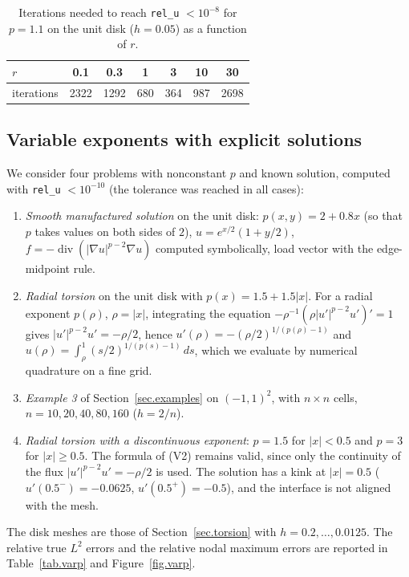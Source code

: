 \documentclass[11pt]{amsart}
\DeclareMathOperator{\dvg}{div}
\theoremstyle{definition}
\theoremstyle{remark}
\numberwithin{equation}{section}
\begin{document}
\begin{table}[ht]
\centering
\caption{Iterations needed to reach \texttt{rel\_u} $<10^{-8}$ for $p=1.1$ on the unit disk ($h=0.05$) as a function of $r$.}\label{tab.r}
\begin{tabular}{lcccccc}
\toprule
$r$ & 0.1 & 0.3 & 1 & 3 & 10 & 30\\
\midrule
iterations & 2322 & 1292 & 680 & 364 & 987 & 2698\\
\bottomrule
\end{tabular}
\end{table}

\subsection{Variable exponents with explicit solutions}\label{sec.varp}
We consider four problems with nonconstant $p$ and known solution, computed with \texttt{rel\_u} $<10^{-10}$ (the tolerance was reached in all cases):
\begin{enumerate}
\item[(V1)] \emph{Smooth manufactured solution} on the unit disk: $p(x,y)=2+0.8x$ (so that $p$ takes values on both sides of $2$), $u=e^{x/2}(1+y/2)$, $f=-\dvg(|\nabla u|^{p-2}\nabla u)$ computed symbolically, load vector with the edge-midpoint rule.
\item[(V2)] \emph{Radial torsion} on the unit disk with $p(x)=1.5+1.5|x|$. For a radial exponent $p(\rho)$, $\rho=|x|$, integrating the equation $-\rho^{-1}(\rho|u'|^{p-2}u')'=1$ gives $|u'|^{p-2}u'=-\rho/2$, hence $u'(\rho)=-(\rho/2)^{1/(p(\rho)-1)}$ and $u(\rho)=\int_\rho^1(s/2)^{1/(p(s)-1)}\,ds$, which we evaluate by numerical quadrature on a fine grid.
\item[(V3)] \emph{Example 3} of Section~\ref{sec.examples} on $(-1,1)^2$, with $n\times n$ cells, $n=10,20,40,80,160$ ($h=2/n$).
\item[(V4)] \emph{Radial torsion with a discontinuous exponent}: $p=1.5$ for $|x|<0.5$ and $p=3$ for $|x|\ge0.5$. The formula of (V2) remains valid, since only the continuity of the flux $|u'|^{p-2}u'=-\rho/2$ is used. The solution has a kink at $|x|=0.5$ ($u'(0.5^-)=-0.0625$, $u'(0.5^+)=-0.5$), and the interface is not aligned with the mesh.
\end{enumerate}
The disk meshes are those of Section~\ref{sec.torsion} with $h=0.2,\dots,0.0125$. The relative true $L^2$ errors and the relative nodal maximum errors are reported in Table~\ref{tab.varp} and Figure~\ref{fig.varp}.
\end{document}
